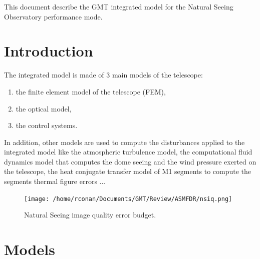 \documentclass{gmto}
\begin{document}
This document describe the GMT integrated model for the Natural Seeing
Observatory performance mode\cite{ORD}.

\section{Introduction}
\label{sec:introduction}

The integrated model is made of 3 main models of the telescope:
\begin{enumerate}
\item the finite element model of the telescope (FEM),
\item the optical model,
\item the control systems.
\end{enumerate}

In addition, other models are used to compute the disturbances applied to the
integrated model like the atmospheric turbulence model, the computational fluid
dynamics model that computes the dome seeing and the wind pressure exerted on
the telescope, the heat conjugate transfer model of M1 segments to compute the
segments thermal figure errors ...

\begin{figure}
  \centering
  \texttt{[image: /home/rconan/Documents/GMT/Review/ASMFDR/nsiq.png]}
  \caption{Natural Seeing image quality error budget.}
  \label{fig:ns-iq}
\end{figure}

\clearpage
\section{Models}
\label{sec:models}
\end{document}
